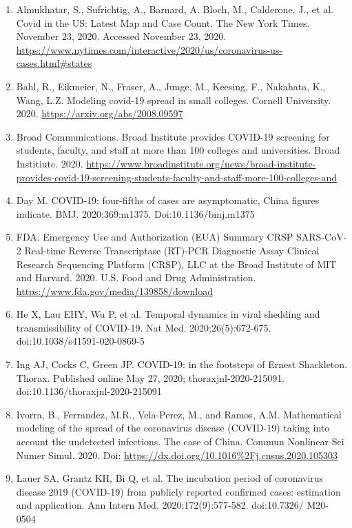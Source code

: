 \documentclass[fullpage]{extarticle}
\begin{document}
\begin{enumerate}
	\item \label{ref:1}Almukhatar, S., Sufrichtig, A., Barnard, A. Bloch, M., Calderone, J., et al. Covid in the US: 
Latest Map and Case Count. The New York Times. November 23, 2020.\hfill\break
	Accessed November 23, 2020.\hfill\break
	\url{https://www.nytimes.com/interactive/2020/us/coronavirus-us-cases.html#states}
	\item \label{ref:2}Bahl, R., Eikmeier, N., Fraser, A., Junge, M., Keesing, F., Nakahata, K., Wang, L.Z. Modeling 
covid-19 spread in small colleges. Cornell University. 2020.\hfill\break
	\url{https://arxiv.org/abs/2008.09597}
	\item \label{ref:3}Broad Communications. Broad Institute provides COVID-19 screening for students, faculty, and 
staff at more than 100 colleges and universities. Broad Institiute. 2020.\hfill\break
	\url{https://www.broadinstitute.org/news/broad-institute-provides-covid-19-screening-students-faculty-and-staff-more-100-colleges-and}
	\item \label{ref:4}Day M. COVID-19: four-fifths of cases are asymptomatic, China figures indicate. BMJ. 
2020;369:m1375. Doi:10.1136/bmj.m1375
	\item \label{ref:5}FDA. Emergency Use and Authorization (EUA) Summary CRSP SARS-CoV-2 Real-time 
Reverse Transcriptase (RT)-PCR Diagnostic Assay Clinical Research Sequencing Platform (CRSP), LLC at the Broad Institute of MIT and Harvard. 2020. U.S. Food and Drug Administration.\hfill\break
	\url{https://www.fda.gov/media/139858/download}
	\item \label{ref:6}He X, Lau EHY, Wu P, et al. Temporal dynamics in viral shedding and transmissibility of 
COVID-19. Nat Med. 2020;26(5):672-675. doi:10.1038/s41591-020-0869-5
	\item \label{ref:7}Ing AJ, Cocks C, Green JP. COVID-19: in the footsteps of Ernest Shackleton. Thorax. Published 
online May 27, 2020; thoraxjnl-2020-215091. doi:10.1136/thoraxjnl-2020-215091
	\item \label{ref:8}Ivorra, B., Ferrandez, M.R., Vela-Perez, M., and Ramos, A.M. Mathematical modeling of the 
spread of the coronavirus disease (COVID-19) taking into account the undetected infections. The case of China. Commun Nonlinear Sci Numer Simul. 2020.\hfill\break
	Doi: \url{https://dx.doi.org/10.1016\%2Fj.cnsns.2020.105303}
	\item \label{ref:9}Lauer SA, Grantz KH, Bi Q, et al. The incubation period of coronavirus disease 2019 
(COVID-19) from publicly reported confirmed cases: estimation and application. Ann Intern Med. 2020;172(9):577-582. doi:10.7326/ M20-0504

\end{enumerate}
\end{document}

